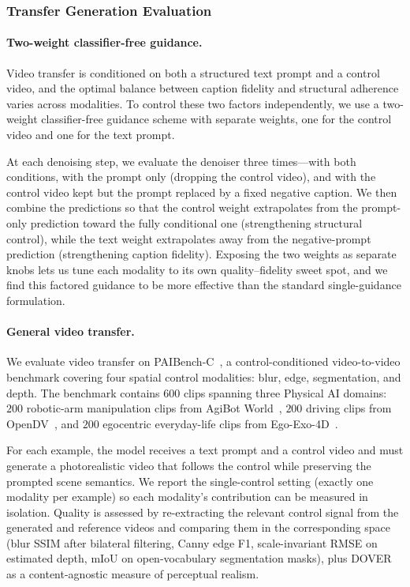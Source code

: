 \subsubsection{Transfer Generation Evaluation}
\label{subsec::transfer_eval}

\paragraph{Two-weight classifier-free guidance.}
Video transfer is conditioned on both a structured text prompt and a control video, and the optimal balance between caption fidelity and structural adherence varies across modalities. To control these two factors independently, we use a two-weight classifier-free guidance scheme with separate weights, one for the control video and one for the text prompt.

At each denoising step, we evaluate the denoiser three times---with both conditions, with the prompt only (dropping the control video), and with the control video kept but the prompt replaced by a fixed negative caption. We then combine the predictions so that the control weight extrapolates from the prompt-only prediction toward the fully conditional one (strengthening structural control), while the text weight extrapolates away from the negative-prompt prediction (strengthening caption fidelity). Exposing the two weights as separate knobs lets us tune each modality to its own quality--fidelity sweet spot, and we find this factored guidance to be more effective than the standard single-guidance formulation.

\paragraph{General video transfer.}
We evaluate video transfer on PAIBench-C~\citep{cosmos_transfer1}, a control-conditioned video-to-video benchmark covering four spatial control modalities: blur, edge, segmentation, and depth. The benchmark contains $600$ clips spanning three Physical AI domains: $200$ robotic-arm manipulation clips from AgiBot World~\citep{bu2025agibot}, $200$ driving clips from OpenDV~\citep{yang2024genad}, and $200$ egocentric everyday-life clips from Ego-Exo-4D~\citep{grauman2024egoexo4d}.

For each example, the model receives a text prompt and a control video and must generate a photorealistic video that follows the control while preserving the prompted scene semantics. We report the single-control setting (exactly one modality per example) so each modality's contribution can be measured in isolation. Quality is assessed by re-extracting the relevant control signal from the generated and reference videos and comparing them in the corresponding space (blur SSIM after bilateral filtering, Canny edge F1, scale-invariant RMSE on estimated depth, mIoU on open-vocabulary segmentation masks), plus DOVER~\citep{dover} as a content-agnostic measure of perceptual realism.

